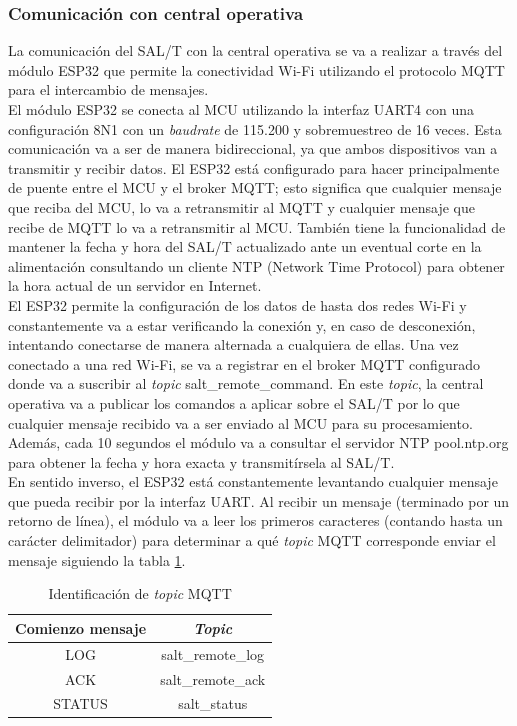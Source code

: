 \subsubsection{Comunicación con central operativa}

La comunicación del SAL/T con la central operativa se va a realizar a través del módulo ESP32 que permite la conectividad Wi-Fi utilizando el protocolo MQTT para el intercambio de mensajes. \\

El módulo ESP32 se conecta al MCU utilizando la interfaz UART4 con una configuración 8N1 con un \textit{baudrate} de 115.200 y sobremuestreo de 16 veces. Esta comunicación va a ser de manera bidireccional, ya que ambos dispositivos van a transmitir y recibir datos. El ESP32 está configurado para hacer principalmente de puente entre el MCU y el broker MQTT; esto significa que cualquier mensaje que reciba del MCU, lo va a retransmitir al MQTT y cualquier mensaje que recibe de MQTT lo va a retransmitir al MCU. También tiene la funcionalidad de mantener la fecha y hora del SAL/T actualizado ante un eventual corte en la alimentación consultando un cliente NTP (Network Time Protocol) para obtener la hora actual de un servidor en Internet.\\ 

El ESP32 permite la configuración de los datos de hasta dos redes Wi-Fi y constantemente va a estar verificando la conexión y, en caso de desconexión, intentando conectarse de manera alternada a cualquiera de ellas. Una vez conectado a una red Wi-Fi, se va a registrar en el broker MQTT configurado donde va a suscribir al \textit{topic} salt\_remote\_command. En este \textit{topic}, la central operativa va a publicar los comandos a aplicar sobre el SAL/T por lo que cualquier mensaje recibido va a ser enviado al MCU para su procesamiento. Además, cada 10 segundos el módulo va a consultar el servidor NTP pool.ntp.org \cite{ntp} para obtener la fecha y hora exacta y transmitírsela al SAL/T. \\ 

En sentido inverso, el ESP32 está constantemente levantando cualquier mensaje que pueda recibir por la interfaz UART. Al recibir un mensaje (terminado por un retorno de línea), el módulo va a leer los primeros caracteres (contando hasta un carácter delimitador) para determinar a qué \textit{topic} MQTT corresponde enviar el mensaje siguiendo la tabla \ref{tab:mqtt_topics}.

\begin{table}[H]
    \centering
    \begin{tabular}{|c|c|}
        \hline
         \textbf{Comienzo mensaje} & \textbf{\textit{Topic}}  \\ \hline
         LOG & salt\_remote\_log  \\ \hline
         ACK & salt\_remote\_ack  \\ \hline
         STATUS  & salt\_status  \\          
         \hline
    \end{tabular}
    \caption{Identificación de \textit{topic} MQTT}
    \label{tab:mqtt_topics}
\end{table}



